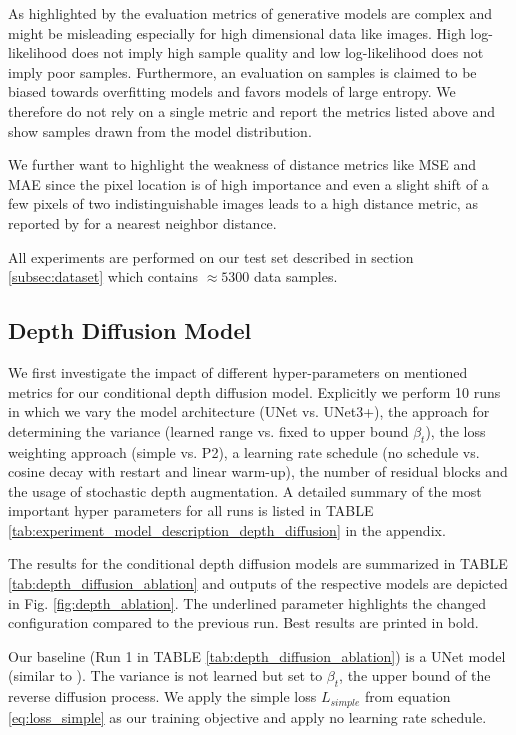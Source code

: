 As highlighted by \cite{theis_note_2016} the evaluation metrics of generative models are complex and might be misleading especially for high dimensional data like images. High log-likelihood does not imply high sample quality and low log-likelihood does not imply poor samples. Furthermore, an evaluation on samples is claimed to be biased towards overfitting models and favors models of large entropy. We therefore do not rely on a single metric and report the metrics listed above and show samples drawn from the model distribution. 

We further want to highlight the weakness of distance metrics like MSE and MAE since the pixel location is of high importance and even a slight shift of a few pixels of two indistinguishable images leads to a high distance metric, as reported by \cite{theis_note_2016} for a nearest neighbor distance.

All experiments are performed on our test set described in section \ref{subsec:dataset} which contains $\approx 5300$ data samples. 

\subsection{Depth Diffusion Model} \label{subsec:experiements_depth_diffusion}
We first investigate the impact of different hyper-parameters on mentioned metrics for our conditional depth diffusion model. Explicitly we perform 10 runs in which we vary the model architecture (UNet vs. UNet3+), the approach for determining the variance (learned range vs. fixed to upper bound $\beta_t$), the loss weighting approach (simple vs. P2), a learning rate schedule (no schedule vs. cosine decay with restart and linear warm-up), the number of residual blocks and the usage of stochastic depth augmentation. A detailed summary of the most important hyper parameters for all runs is listed in TABLE \ref{tab:experiment_model_description_depth_diffusion} in the appendix.

The results for the conditional depth diffusion models are summarized in TABLE \ref{tab:depth_diffusion_ablation} and outputs of the respective models are depicted in Fig. \ref{fig:depth_ablation}. The underlined parameter highlights the changed configuration compared to the previous run. Best results are printed in bold.

Our baseline (Run 1 in TABLE \ref{tab:depth_diffusion_ablation}) is a UNet model (similar to \cite{dhariwal_diffusion_2021}). The variance is not learned but set to $\beta_t$, the upper bound of the reverse diffusion process. We apply the simple loss $L_{simple}$ from equation \eqref{eq:loss_simple} as our training objective and apply no learning rate schedule. 

